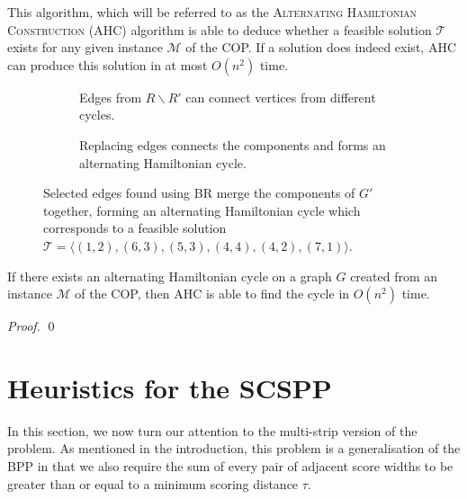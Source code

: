 \documentclass[oribibl]{llncs}
\begin{document}
This algorithm, which will be referred to as the \textsc{Alternating Hamiltonian Construction} (AHC) algorithm is able to deduce whether a feasible solution $\mathcal{T}$ exists for any given instance $\mathcal{M}$ of the COP. If a solution does indeed exist, AHC can produce this solution in at most $O(n^2)$ time.

\begin{figure}	
	\centering
	\begin{subfigure}[H]{0.5\textwidth}
		
		\caption{Edges from $R\backslash R'$ can connect vertices from different cycles.}	
		\label{fig:mpsconnect}
	\end{subfigure}
	\begin{subfigure}[H]{0.5\textwidth}
		
		\caption{Replacing edges connects the components and forms an alternating Hamiltonian cycle.}	
		\label{fig:mpscycle}
	\end{subfigure}
	\caption{Selected edges found using BR merge the components of $G'$ together, forming an alternating Hamiltonian cycle which corresponds to a feasible solution $\mathcal{T} = \langle(1,2), (6,3), (5,3), (4,4), (4,2), (7,1) \rangle$.}
	\label{fig:connect/cycle}
\end{figure}


\begin{theorem}
	\label{thm:copsoln}
	If there exists an alternating Hamiltonian cycle on a graph $G$ created from an instance $\mathcal{M}$ of the COP, then AHC is able to find the cycle in $O(n^2)$ time.
\end{theorem}
\begin{proof}
	\qed
\end{proof}


\section{Heuristics for the SCSPP}
\label{sec:scsppsoln}

In this section, we now turn our attention to the multi-strip version of the problem. As mentioned in the introduction, this problem is a generalisation of the BPP in that we also require the sum of every pair of adjacent score widths to be greater than or equal to a minimum scoring distance $\tau$.
\end{document}

